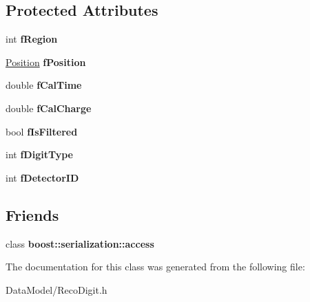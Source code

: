 \subsection*{Protected Attributes}
\begin{DoxyCompactItemize}
\item 
\hypertarget{classRecoDigit_ae74b120795ec48de1d5cea5e4a98adbf}{
int {\bfseries fRegion}}
\label{classRecoDigit_ae74b120795ec48de1d5cea5e4a98adbf}

\item 
\hypertarget{classRecoDigit_ab71e3023b350a15c2c38e8e30ced2d1c}{
\hyperlink{classPosition}{Position} {\bfseries fPosition}}
\label{classRecoDigit_ab71e3023b350a15c2c38e8e30ced2d1c}

\item 
\hypertarget{classRecoDigit_a776c1d20c30b00592084694d4b83a1b2}{
double {\bfseries fCalTime}}
\label{classRecoDigit_a776c1d20c30b00592084694d4b83a1b2}

\item 
\hypertarget{classRecoDigit_abd1954b7a04f5f13cadb9632aae55a88}{
double {\bfseries fCalCharge}}
\label{classRecoDigit_abd1954b7a04f5f13cadb9632aae55a88}

\item 
\hypertarget{classRecoDigit_a495d492b0bd93ececf36e67640bb18ff}{
bool {\bfseries fIsFiltered}}
\label{classRecoDigit_a495d492b0bd93ececf36e67640bb18ff}

\item 
\hypertarget{classRecoDigit_a705e426d69c0160f0529b999f76c36af}{
int {\bfseries fDigitType}}
\label{classRecoDigit_a705e426d69c0160f0529b999f76c36af}

\item 
\hypertarget{classRecoDigit_aa3fb00f02b02329aad2cb1634da5e3e8}{
int {\bfseries fDetectorID}}
\label{classRecoDigit_aa3fb00f02b02329aad2cb1634da5e3e8}

\end{DoxyCompactItemize}
\subsection*{Friends}
\begin{DoxyCompactItemize}
\item 
\hypertarget{classRecoDigit_ac98d07dd8f7b70e16ccb9a01abf56b9c}{
class {\bfseries boost::serialization::access}}
\label{classRecoDigit_ac98d07dd8f7b70e16ccb9a01abf56b9c}

\end{DoxyCompactItemize}


The documentation for this class was generated from the following file:\begin{DoxyCompactItemize}
\item 
DataModel/RecoDigit.h\end{DoxyCompactItemize}
